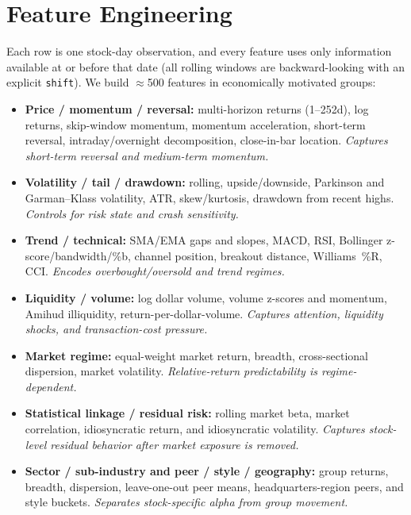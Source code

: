 \documentclass[9pt]{extarticle}
\begin{document}
\section{Feature Engineering}

Each row is one stock-day observation, and every feature uses only information
available at or before that date (all rolling windows are backward-looking with
an explicit \texttt{shift}). We build $\approx$500 features in economically
motivated groups:

\begin{itemize}
  \item \textbf{Price / momentum / reversal:} multi-horizon returns
  (1--252d), log returns, skip-window momentum, momentum acceleration,
  short-term reversal, intraday/overnight decomposition, close-in-bar location.
  \emph{Captures short-term reversal and medium-term momentum.}
  \item \textbf{Volatility / tail / drawdown:} rolling, upside/downside,
  Parkinson and Garman--Klass volatility, ATR, skew/kurtosis, drawdown from
  recent highs. \emph{Controls for risk state and crash sensitivity.}
  \item \textbf{Trend / technical:} SMA/EMA gaps and slopes, MACD, RSI,
  Bollinger z-score/bandwidth/\%b, channel position, breakout distance,
  Williams~\%R, CCI. \emph{Encodes overbought/oversold and trend regimes.}
  \item \textbf{Liquidity / volume:} log dollar volume, volume z-scores and
  momentum, Amihud illiquidity, return-per-dollar-volume. \emph{Captures
  attention, liquidity shocks, and transaction-cost pressure.}
  \item \textbf{Market regime:} equal-weight market return, breadth,
  cross-sectional dispersion, market volatility. \emph{Relative-return
  predictability is regime-dependent.}
  \item \textbf{Statistical linkage / residual risk:} rolling market beta,
  market correlation, idiosyncratic return, and idiosyncratic volatility.
  \emph{Captures stock-level residual behavior after market exposure is
  removed.}
  \item \textbf{Sector / sub-industry and peer / style / geography:} group
  returns, breadth, dispersion, leave-one-out peer means, headquarters-region
  peers, and style buckets. \emph{Separates stock-specific alpha from group
  movement.}

\end{itemize}
\end{document}
